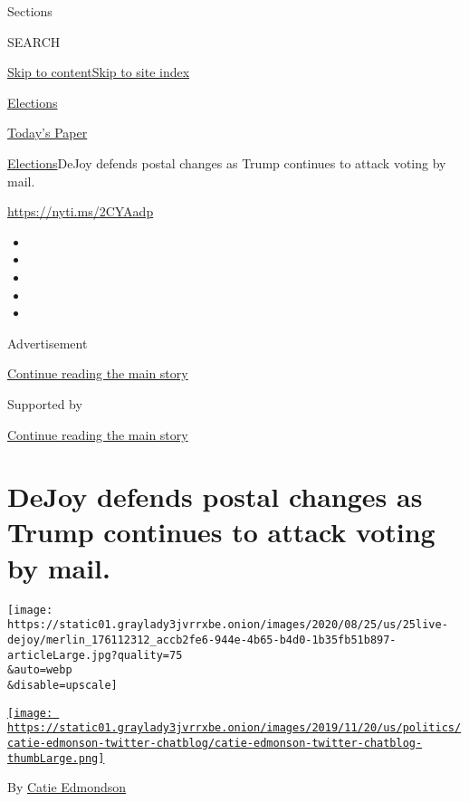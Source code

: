 Sections

SEARCH

\protect\hyperlink{site-content}{Skip to
content}\protect\hyperlink{site-index}{Skip to site index}

\href{https://www.nytimes3xbfgragh.onion/news-event/2020-election}{Elections}

\href{https://myaccount.nytimes3xbfgragh.onion/auth/login?response_type=cookie\&client_id=vi}{}

\href{https://www.nytimes3xbfgragh.onion/section/todayspaper}{Today's
Paper}

\href{/news-event/2020-election}{Elections}\textbar{}DeJoy defends
postal changes as Trump continues to attack voting by mail.

\url{https://nyti.ms/2CYAadp}

\begin{itemize}
\item
\item
\item
\item
\item
\end{itemize}

Advertisement

\protect\hyperlink{after-top}{Continue reading the main story}

Supported by

\protect\hyperlink{after-sponsor}{Continue reading the main story}

\hypertarget{dejoy-defends-postal-changes-as-trump-continues-to-attack-voting-by-mail}{%
\section{DeJoy defends postal changes as Trump continues to attack
voting by
mail.}\label{dejoy-defends-postal-changes-as-trump-continues-to-attack-voting-by-mail}}

\texttt{[image: https://static01.graylady3jvrrxbe.onion/images/2020/08/25/us/25live-dejoy/merlin\_176112312\_accb2fe6-944e-4b65-b4d0-1b35fb51b897-articleLarge.jpg?quality=75\\\&auto=webp\\\&disable=upscale]}

\href{https://www.nytimes3xbfgragh.onion/by/catie-edmondson}{\texttt{[image: https://static01.graylady3jvrrxbe.onion/images/2019/11/20/us/politics/catie-edmonson-twitter-chatblog/catie-edmonson-twitter-chatblog-thumbLarge.png]}}

By \href{https://www.nytimes3xbfgragh.onion/by/catie-edmondson}{Catie
Edmondson}

